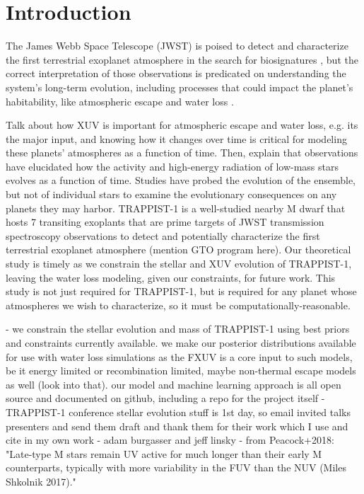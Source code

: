 \documentclass[twocolumn]{aastex62}
\begin{document}

\section{Introduction} \label{sec:intro}

The James Webb Space Telescope (JWST) is poised to detect and characterize the first terrestrial exoplanet atmosphere in the search for biosignatures \citep{Morley2017,Lincowski2018,Lustig2019}, but the correct interpretation of those observations is predicated on understanding the system's long-term evolution, including processes that could impact the planet's habitability, like atmospheric escape \citep{Lammer2003,MurrayClay2009} and water loss \citep{Luger2015}. 

Talk about how XUV is important for atmospheric escape and water loss, e.g. its the major input, and knowing how it changes over time is critical for modeling these planets' atmospheres as a function of time. Then, explain that observations have elucidated how the activity and high-energy radiation of low-mass stars evolves as a function of time. Studies have probed the evolution of the ensemble, but not of individual stars to examine the evolutionary consequences on any planets they may harbor. TRAPPIST-1 is a well-studied nearby M dwarf that hosts 7 transiting exoplants that are prime targets of JWST transmission spectroscopy observations to detect and potentially characterize the first terrestrial exoplanet atmosphere (mention GTO program here). Our theoretical study is timely as we constrain the stellar and XUV evolution of TRAPPIST-1, leaving the water loss modeling, given our constraints, for future work. This study is not just required for TRAPPIST-1, but is required for any planet whose atmospheres we wish to characterize, so it must be computationally-reasonable.

- we constrain the stellar evolution and mass of TRAPPIST-1 using best priors and constraints currently available. we make our posterior distributions available for use with water loss simulations as the FXUV is a core input to such models, be it energy limited or recombination limited, maybe non-thermal escape models as well (look into that). our model and machine learning approach is all open source and documented on github, including a repo for the project itself
- TRAPPIST-1 conference stellar evolution stuff is 1st day, so email invited talks presenters and send them draft and thank them for their work which I use and cite in my own work - adam burgasser and jeff linsky
- from Peacock+2018: "Late-type M stars remain UV active for much longer than their early M counterparts, typically with more variability in the FUV than the NUV (Miles Shkolnik 2017)."
\end{document}
